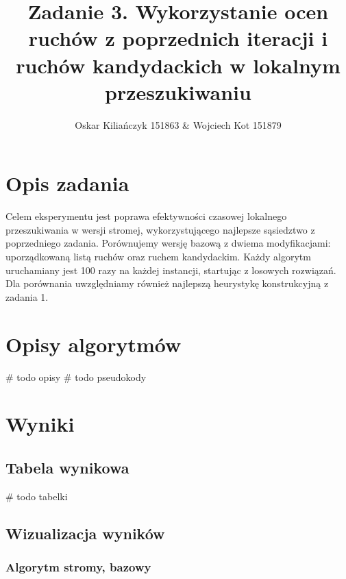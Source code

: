 \documentclass[11pt]{article}
\title{Zadanie 3. Wykorzystanie ocen ruchów z poprzednich iteracji i ruchów
kandydackich w lokalnym przeszukiwaniu}
\author{Oskar Kiliańczyk 151863 \& Wojciech Kot 151879}
\date{}
\begin{document}
\maketitle
\newpage

\section{Opis zadania}\label{sec:opis-zadania}

Celem eksperymentu jest poprawa efektywności czasowej lokalnego przeszukiwania w wersji stromej, wykorzystującego najlepsze sąsiedztwo z poprzedniego zadania.
Porównujemy wersję bazową z dwiema modyfikacjami: uporządkowaną listą ruchów oraz ruchem kandydackim.
Każdy algorytm uruchamiany jest 100 razy na każdej instancji, startując z losowych rozwiązań.
Dla porównania uwzględniamy również najlepszą heurystykę konstrukcyjną z zadania 1.

\section{Opisy algorytmów}\label{sec:opisy-alg}

# todo opisy
# todo pseudokody

\section{Wyniki}\label{sec:wyniki}

\subsection{Tabela wynikowa}\label{subsec:tabela-wynikowa}

# todo tabelki

\subsection{Wizualizacja wyników}\label{subsec:wizualizacja-wynikow}

\subsubsection{Algorytm stromy, bazowy}\label{subsubsec:algorytm-stromy-bazowy}
\end{document}
